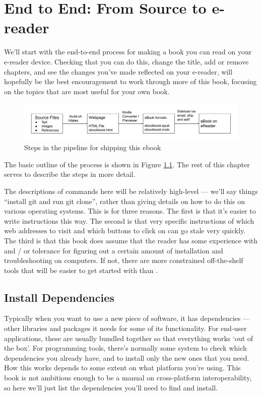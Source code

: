 
\chapter{End to End: From Source to e-reader}

We'll start with the end-to-end process for making a book you can read
on your e-reader device. Checking that you can do this, change the title,
add or remove chapters, and see the changes you've made reflected on your 
e-reader, will hopefully be the best encouragement to work through more
of this book, focusing on the topics that are most useful for your own book.

\begin{figure}
\includegraphics[width=\linewidth]{images/pipeline.png}
\caption{Steps in the pipeline for shipping this ebook}
\label{fig:pipeline}
\end{figure}

The basic outline of the process is shown in Figure \ref{fig:pipeline}.
The rest of this chapter serves to describe the steps in more detail.

The descriptions of commands here will be relatively high-level ---
we'll say things ``install git and run git clone'', rather than giving
details on how to do this on various operating systems. This is for
three reasons. The first is that it's easier to write instructions
this way. The second is that very specific instructions of which web
addresses to visit and which buttons to click on can go stale very
quickly. The third is that this book does assume that the reader has
some experience with and / or tolerance for figuring out a certain
amount of installation and troubleshooting on computers. If not, there are
more constrained off-the-shelf tools that will be easier to get started with
than \latex.

\section{Install Dependencies}

Typically when you want to use a new piece of software, it has
dependencies --- other libraries and packages it needs for some of its
functionality. For end-user applications, these are usually bundled
together so that everything works `out of the box'. For programming
tools, there's normally some system to check which dependencies you
already have, and to install only the new ones that you need. How this
works depends to some extent on what platform you're using. This book
is not ambitious enough to be a manual on cross-platform
interoperability, so here we'll just list the dependencies you'll need
to find and install.


